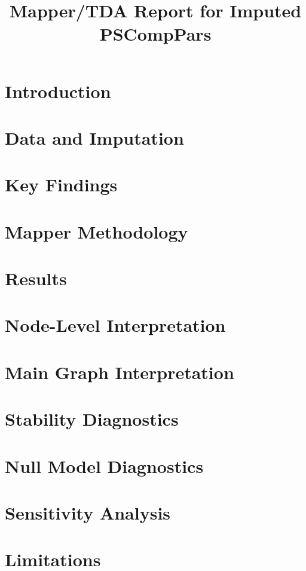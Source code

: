 \documentclass[11pt]{article}
\title{Mapper/TDA Report for Imputed PSCompPars}
\date{}
\begin{document}
\maketitle

\section{Introduction}

\section{Data and Imputation}

\section{Key Findings}

\section{Mapper Methodology}

\section{Results}

\section{Node-Level Interpretation}

\section{Main Graph Interpretation}

\section{Stability Diagnostics}

\section{Null Model Diagnostics}

\section{Sensitivity Analysis}

\section{Limitations}

\end{document}
